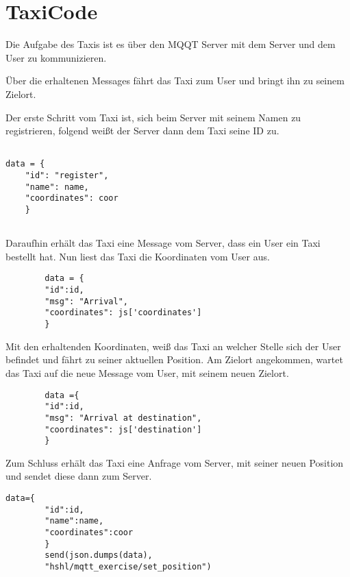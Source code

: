 \section{TaxiCode}

Die Aufgabe des Taxis ist es über den MQQT Server mit dem Server und dem User zu kommunizieren.
 
Über die erhaltenen Messages fährt das Taxi zum User und bringt ihn zu seinem Zielort.

Der erste Schritt vom Taxi ist, sich beim Server mit seinem Namen zu registrieren, folgend weißt der Server dann dem Taxi seine ID zu.

\begin{lstlisting} 

data = {
	"id": "register", 
	"name": name,
	"coordinates": coor
    }
    
\end{lstlisting}



Daraufhin erhält das Taxi eine Message vom Server, dass ein User ein Taxi bestellt hat. 
Nun liest das Taxi die Koordinaten vom User aus. 

\begin{lstlisting} 
        data = {
        "id":id,
        "msg": "Arrival",
        "coordinates": js['coordinates']
        }
\end{lstlisting}



Mit den erhaltenden Koordinaten, weiß das Taxi an welcher Stelle sich der User befindet und fährt zu seiner aktuellen Position.
Am Zielort angekommen, wartet das Taxi auf die neue Message vom User, mit seinem neuen Zielort.


\begin{lstlisting} 
        data ={
        "id":id,
        "msg": "Arrival at destination",
        "coordinates": js['destination']
        }
\end{lstlisting}



Zum Schluss erhält das Taxi eine Anfrage vom Server, mit seiner neuen Position und sendet diese dann zum Server.

\begin{lstlisting} 
data={
        "id":id,
        "name":name,
        "coordinates":coor
        }
        send(json.dumps(data),
        "hshl/mqtt_exercise/set_position")

\end{lstlisting}
